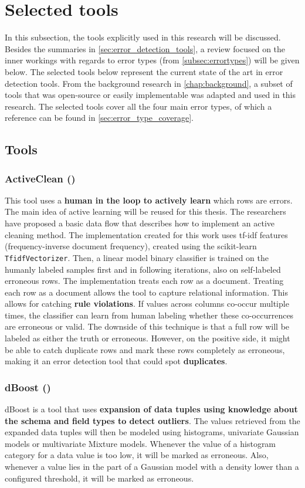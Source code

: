 \chapter{Selected tools}
\label{chap:selectedtools}
In this subsection, the tools explicitly used in this research will be discussed. Besides the summaries in \autoref{sec:error_detection_tools}, a review focused on the inner workings with regards to error types (from \autoref{subsec:errortypes}) will be given below. 
The selected tools below represent the current state of the art in error detection tools. From the background research in \autoref{chap:background}, a subset of tools that was open-source or easily implementable was adapted and used in this research. The selected tools cover all the four main error types, of which a reference can be found in \autoref{sec:error_type_coverage}.

\section{Tools}
\subsection{ActiveClean (\cite{Krishnan2016-rg})}
This tool uses a \textbf{human in the loop to actively learn} which rows are errors. 
The main idea of active learning will be reused for this thesis. The researchers have proposed a basic data flow that describes how to implement an active cleaning method. 
The implementation created for this work uses tf-idf features (frequency-inverse document frequency), created using the scikit-learn \verb|TfidfVectorizer|. Then, a linear model binary classifier is trained on the humanly labeled samples first and in following iterations, also on self-labeled erroneous rows. The implementation treats each row as a document. 
Treating each row as a document allows the tool to capture relational information. This allows for catching \textbf{rule violations}. If values across columns co-occur multiple times, the classifier can learn from human labeling whether these co-occurrences are erroneous or valid. The downside of this technique is that a full row will be labeled as either the truth or erroneous. However, on the positive side, it might be able to catch duplicate rows and mark these rows completely as erroneous, making it an error detection tool that could spot \textbf{duplicates}.

\subsection{dBoost (\cite{Pit--Claudel2016-dj})}
dBoost is a tool that uses \textbf{expansion of data tuples using knowledge about the schema and field types to detect outliers}. The values retrieved from the expanded data tuples will then be modeled using histograms, univariate Gaussian models or multivariate Mixture models. Whenever the value of a histogram category for a data value is too low, it will be marked as erroneous. Also, whenever a value lies in the part of a Gaussian model with a density lower than a configured threshold, it will be marked as erroneous. 


